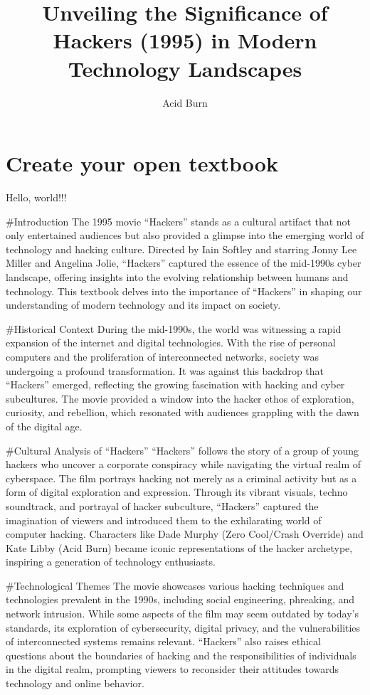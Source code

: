 \documentclass[
  openany]{book}
\title{Unveiling the Significance of Hackers (1995) in Modern Technology Landscapes}
\author{Acid Burn}
\date{}
\begin{document}
\maketitle

{
\setcounter{tocdepth}{1}
\tableofcontents
}
\hypertarget{create-your-open-textbook}{%
\chapter{Create your open textbook}\label{create-your-open-textbook}}

Hello, world!!!

\#Introduction
The 1995 movie ``Hackers'' stands as a cultural artifact that not only entertained audiences but also provided a glimpse into the emerging world of technology and hacking culture. Directed by Iain Softley and starring Jonny Lee Miller and Angelina Jolie, ``Hackers'' captured the essence of the mid-1990s cyber landscape, offering insights into the evolving relationship between humans and technology. This textbook delves into the importance of ``Hackers'' in shaping our understanding of modern technology and its impact on society.

\#Historical Context
During the mid-1990s, the world was witnessing a rapid expansion of the internet and digital technologies. With the rise of personal computers and the proliferation of interconnected networks, society was undergoing a profound transformation. It was against this backdrop that ``Hackers'' emerged, reflecting the growing fascination with hacking and cyber subcultures. The movie provided a window into the hacker ethos of exploration, curiosity, and rebellion, which resonated with audiences grappling with the dawn of the digital age.

\#Cultural Analysis of ``Hackers''
``Hackers'' follows the story of a group of young hackers who uncover a corporate conspiracy while navigating the virtual realm of cyberspace. The film portrays hacking not merely as a criminal activity but as a form of digital exploration and expression. Through its vibrant visuals, techno soundtrack, and portrayal of hacker subculture, ``Hackers'' captured the imagination of viewers and introduced them to the exhilarating world of computer hacking. Characters like Dade Murphy (Zero Cool/Crash Override) and Kate Libby (Acid Burn) became iconic representations of the hacker archetype, inspiring a generation of technology enthusiasts.

\#Technological Themes
The movie showcases various hacking techniques and technologies prevalent in the 1990s, including social engineering, phreaking, and network intrusion. While some aspects of the film may seem outdated by today's standards, its exploration of cybersecurity, digital privacy, and the vulnerabilities of interconnected systems remains relevant. ``Hackers'' also raises ethical questions about the boundaries of hacking and the responsibilities of individuals in the digital realm, prompting viewers to reconsider their attitudes towards technology and online behavior.
\end{document}
